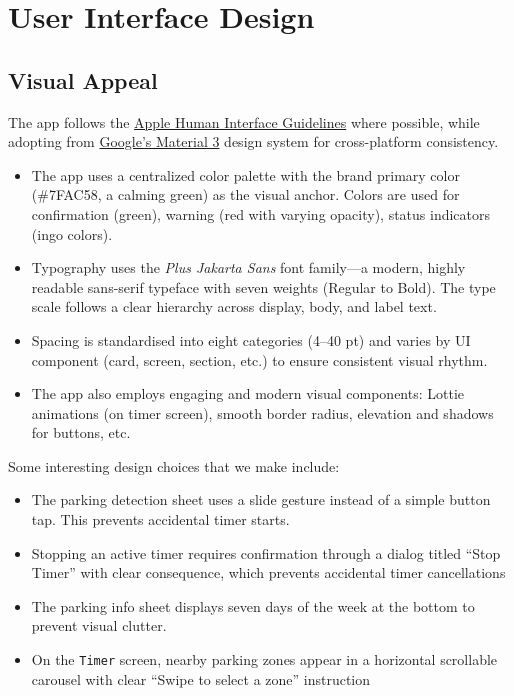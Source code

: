 \section{User Interface Design}

\subsection{Visual Appeal}

The app follows the \href{https://developer.apple.com/design/human-interface-guidelines/}{Apple Human Interface Guidelines} where possible, while adopting from \href{https://m3.material.io/}{Google's Material 3} design system for cross-platform consistency.

\begin{itemize}
    \item The app uses a centralized color palette with the brand primary color (\#7FAC58, a calming green) as the visual anchor. Colors are used for confirmation (green), warning (red with varying opacity), status indicators (ingo colors).
    \item Typography uses the \emph{Plus Jakarta Sans} font family—a modern, highly readable sans-serif typeface with seven weights (Regular to Bold). The type scale follows a clear hierarchy across display, body, and label text.
    \item Spacing is standardised into eight categories (4–40 pt) and varies by UI component (card, screen, section, etc.) to ensure consistent visual rhythm.
    \item The app also employs engaging and modern visual components: Lottie animations (on timer screen), smooth border radius, elevation and shadows for buttons, etc.
\end{itemize}

Some interesting design choices that we make include:

\begin{itemize}
    \item The parking detection sheet uses a slide gesture instead of a simple button tap. This prevents accidental timer starts.
    \item Stopping an active timer requires confirmation through a dialog titled ``Stop Timer'' with clear consequence, which prevents accidental timer cancellations
    \item The parking info sheet displays seven days of the week at the bottom to prevent visual clutter.
    \item On the \texttt{Timer} screen, nearby parking zones appear in a horizontal scrollable carousel with clear “Swipe to select a zone” instruction
\end{itemize}

